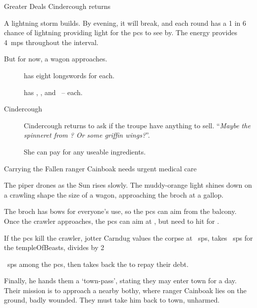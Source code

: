 \documentclass[10pt,twoside]{book}
\begin{document}
{Greater Deals}%
{Cindercough returns}%

A lightning storm builds.
By evening, it will break, and each \gls{round} has a 1 in 6 chance of lightning providing light for the \glspl{pc} to see by.
The energy provides 4~\glspl{mp} throughout the \gls{interval}.

But for now, a wagon approaches.

\begin{description}
  \item[\composeHumanName]
  has eight longswords for  each.
  \item[\composeHumanName]
  has \rations, \rations, and \rations\ --  each.
  \item[Cindercough]
  Cindercough returns to ask if the troupe have anything to sell.
  ``\textit{Maybe the spinneret from ?  Or some \gls{griffin} wings?}''.

  She can pay  for any useable \glspl{ingredient}.
\end{description}


\begin{figure}[t]
  \chitincrawler
  \setcounter{gold}{\value{xp}}
\end{figure}%

{Carrying the Fallen}%
{\Gls{ranger} Cainboak needs urgent medical care}%

The piper drones as the Sun rises slowly.
The muddy-orange light shines down on a crawling shape the size of a wagon, approaching the \gls{broch} at a gallop.

The \gls{broch} has \glspl{bow} for everyone's use, so the \glspl{pc} can aim from the balcony.
Once the \gls{crawler} approaches, the \glspl{pc} can aim at \tn[12], but need to hit \tn[17] for .

If the \glspl{pc} kill the \gls{crawler}, \gls{jotter} Carndug values the corpse at ~\glspl{sp}, takes
~\glspl{sp} for the \gls{templeOfBeasts}, divides
\divide\value{gold} by 2%
\addtocounter{gold}{0}%
~\glspl{sp} among the \glspl{pc}, then takes back the  to repay their debt.

Finally, he hands them a `town-pass', stating they may enter town for a day.
Their mission is to approach a nearby \gls{bothy}, where \gls{ranger} Cainboak lies on the ground, badly wounded.
They must take him back to town, unharmed.
\end{document}
